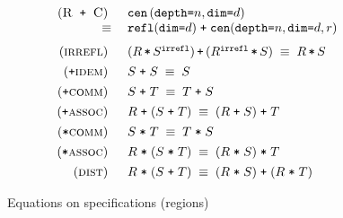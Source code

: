 \documentclass[9pt]{sigplanconf}
\theoremstyle{definition}
\newcommand{\term}[1]{\texttt{#1}}
\newcommand{\stenCenS}[2]{\term{cen} \, (\term{depth=}#1,
  \term{dim=}#2)}
\newcommand{\irreflS}{\texttt{irrefl}}
\newcommand{\stenCenSR}[3]{\term{cen} (\term{depth=}#1,
  \term{dim=}#2, #3)}
\newcommand{\stenReflSR}[1]{\term{refl} (\term{dim=}#1)}
\begin{document}
\begin{figure}
\begin{align*}
\begin{array}{c}
\begin{array}{rll}
%
%
(\textsc{R\, \texttt{+} \,C}) \;\; &
\stenCenS{n}{d} \\
\equiv \; & \stenReflSR{d} \; \texttt{+} \; \stenCenSR{n}{d}{r} \\[0.7em]
%
%
(\textsc{irrefl}) \;\; & (R \, \term{*} \, S^\irreflS) \, \term{+} \,
                         (R^\irreflS \, \term{*} \, S) \;
\equiv \; R \, \term{*} \, S \\[0.4em]
%
%
(\texttt{+}\textsc{idem}) \;\; & S \; \texttt{+} \; S \; \equiv \; S \\[0.4em]
%
(\texttt{+}\textsc{comm}) \;\; & S \; \texttt{+} \; T \; \equiv \; T \;
                       \texttt{+} \; S \\[0.4em]
%
(\texttt{+}\textsc{assoc}) \;\; & R \; \texttt{+} \; (S \; \texttt{+} \; T) \; \equiv \; (R \;
                       \texttt{+} \; S) \; \texttt{+} \; T \\[0.4em]
(\texttt{*}\textsc{comm}) \;\; & S \; \texttt{*} \; T \; \equiv \; T \;
                       \texttt{*} \; S \\[0.4em]
%
(\texttt{*}\textsc{assoc}) \;\; & R \; \texttt{*} \; (S \; \texttt{*} \; T) \; \equiv \; (R \;
                       \texttt{*} \; S) \; \texttt{*} \; T \\[0.4em]
(\textsc{dist}) \;\; & R \; \texttt{*} \; (S \; \texttt{+} \; T) \; \equiv \; (R \;
                       \texttt{*} \; S) \; \texttt{+} \; (R
                       \; \texttt{*} \; T)
\end{array}
%
\end{array}
\end{align*}
\caption{Equations on specifications (regions)}
\vspace{-1em}
\label{fig:equations}
\end{figure}
\end{document}
